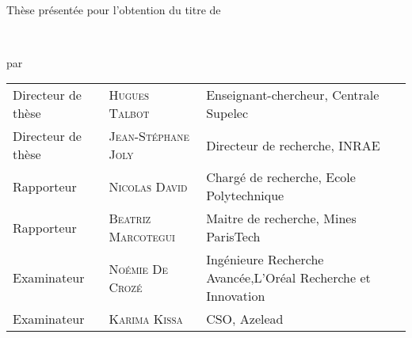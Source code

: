 
\begin{titlepage}

\begin{addmargin}[-1cm]{-3cm}
\begin{center}

\hfill
\vfill

\large
\myUni \\
\myDepartment 
\normalsize

\vfill

Thèse présentée pour l'obtention du titre de \\

\large \myDegree
\normalsize

\vfill

\begingroup
\color{Maroon}\spacedallcaps{\myTitle} \\ \bigskip %
\mySubtitle
\endgroup

par

\large
\spacedlowsmallcaps{\myName} %
\normalsize
\vfill


\myTime

\begin{tabularx}{\linewidth}{lll}
    Directeur de thèse & \textsc{Hugues Talbot} & Enseignant-chercheur, Centrale Supelec\\
    Directeur de thèse & \textsc{Jean-Stéphane Joly} & Directeur de recherche, INRAE\\
    Rapporteur & \textsc{Nicolas David} & Chargé de recherche, Ecole Polytechnique\\ %
    Rapporteur & \textsc{Beatriz Marcotegui} & Maitre de recherche, Mines ParisTech\\
    Examinateur & \textsc{Noémie De Crozé} & Ingénieure Recherche Avancée,\newline L'Oréal Recherche et Innovation\\ %
    Examinateur & \textsc{Karima Kissa} & CSO, Azelead
\end{tabularx}

\vfill

\end{center}
\end{addmargin}

\end{titlepage}